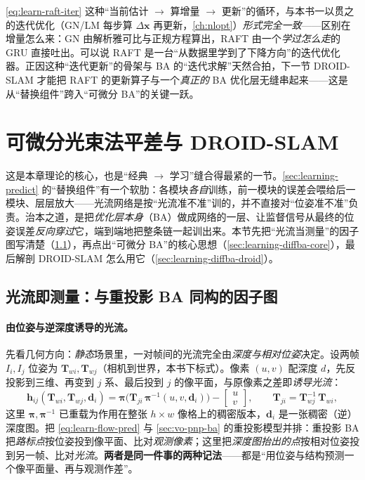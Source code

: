 \begin{insight}[RAFT $=$“学过的”迭代优化器]
\cref{eq:learn-raft-iter} 这种“当前估计 $\to$ 算增量 $\to$ 更新”的循环，与本书一以贯之的迭代优化（GN/LM 每步算 $\Delta\mathbf{x}$ 再更新，\cref{ch:nlopt}）\emph{形式完全一致}——区别在增量怎么来：GN 由解析雅可比与正规方程算出，RAFT 由一个\emph{学过怎么走}的 GRU 直接吐出。可以说 RAFT 是一台“从数据里学到了下降方向”的迭代优化器。正因这种“迭代更新”的骨架与 BA 的“迭代求解”天然合拍，下一节 DROID-SLAM 才能把 RAFT 的更新算子与一个\emph{真正的} BA 优化层无缝串起来——这是从“替换组件”跨入“可微分 BA”的关键一跃。
\end{insight}

\section{可微分光束法平差与 DROID-SLAM}
\label{sec:learning-diffba}

这是本章理论的核心，也是“经典 $\to$ 学习”缝合得最紧的一节。\cref{sec:learning-predict} 的“替换组件”有一个软肋：各模块\emph{各自}训练，前一模块的误差会喂给后一模块、层层放大——光流网络是按“光流准不准”训的，并不直接对“位姿准不准”负责\cite{teed2026boosting}。治本之道，是把\emph{优化层本身}（BA）做成网络的一层、让监督信号从最终的位姿误差\emph{反向穿过}它，端到端地把整条链一起训出来。本节先把“光流当测量”的因子图写清楚（\cref{sec:learning-diffba-flow}），再点出“可微分 BA”的核心思想（\cref{sec:learning-diffba-core}），最后解剖 DROID-SLAM 怎么用它（\cref{sec:learning-diffba-droid}）。

\subsection{光流即测量：与重投影 BA 同构的因子图}
\label{sec:learning-diffba-flow}

\paragraph{由位姿与逆深度诱导的光流。}
先看几何方向：\emph{静态}场景里，一对帧间的光流完全由\emph{深度与相对位姿}决定。设两帧 $I_i,I_j$ 位姿为 $\mathbf{T}_{wi},\mathbf{T}_{wj}$（相机到世界，本书下标式）。像素 $(u,v)$ 配深度 $d$，先反投影到三维、再变到 $j$ 系、最后投到 $j$ 的像平面，与原像素之差即\emph{诱导光流}：
\begin{equation}
  \mathbf{h}_{ij}(\mathbf{T}_{wi},\mathbf{T}_{wj},\mathbf{d}_i)
  =\boldsymbol\pi\!\Big(\mathbf{T}_{ji}\,\boldsymbol\pi^{-1}(u,v,\mathbf{d}_i)\Big)-\begin{bmatrix}u\\v\end{bmatrix},
  \qquad \mathbf{T}_{ji}=\mathbf{T}_{wj}^{-1}\,\mathbf{T}_{wi},
  \label{eq:learn-flow-pred}
\end{equation}
这里 $\boldsymbol\pi,\boldsymbol\pi^{-1}$ 已重载为作用在整张 $h\times w$ 像格上的稠密版本，$\mathbf{d}_i$ 是一张稠密（逆）深度图。把 \cref{eq:learn-flow-pred} 与 \cref{sec:vo-pnp-ba} 的重投影模型并排：重投影 BA 把\emph{路标点}按位姿投到像平面、比对\emph{观测像素}；这里把\emph{深度图抬出的点}按相对位姿投到另一帧、比对\emph{光流}。\textbf{两者是同一件事的两种记法}——都是“用位姿与结构预测一个像平面量、再与观测作差”。

